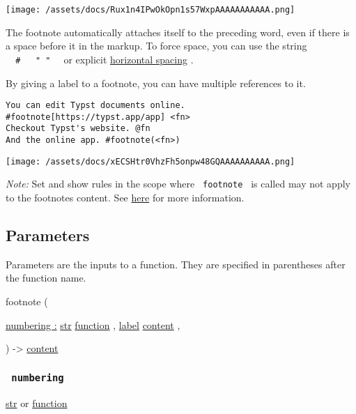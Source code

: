 \texttt{[image: /assets/docs/Rux1n4IPwOkOpn1s57WxpAAAAAAAAAAA.png]}

The footnote automatically attaches itself to the preceding word, even
if there is a space before it in the markup. To force space, you can use
the string
\texttt{\ }{\texttt{\ \#\ }}\texttt{\ }{\texttt{\ "\ "\ }}\texttt{\ } or
explicit \href{/docs/reference/layout/h/}{horizontal spacing} .

By giving a label to a footnote, you can have multiple references to it.

\begin{verbatim}
You can edit Typst documents online.
#footnote[https://typst.app/app] <fn>
Checkout Typst's website. @fn
And the online app. #footnote(<fn>)
\end{verbatim}

\texttt{[image: /assets/docs/xECSHtr0VhzFh5onpw48GQAAAAAAAAAA.png]}

\emph{Note:} Set and show rules in the scope where \texttt{\ footnote\ }
is called may not apply to the footnote\textquotesingle s content. See
\href{https://github.com/typst/typst/issues/1467\#issuecomment-1588799440}{here}
for more information.

\subsection{\texorpdfstring{{ Parameters
}}{ Parameters }}\label{parameters}

\label{parameters-tooltip}
Parameters are the inputs to a function. They are specified in
parentheses after the function name.

{ footnote } (

{ \hyperref[parameters-numbering]{numbering :}
\href{/docs/reference/foundations/str/}{str}
\href{/docs/reference/foundations/function/}{function} , } {
\href{/docs/reference/foundations/label/}{label}
\href{/docs/reference/foundations/content/}{content} , }

) -\textgreater{} \href{/docs/reference/foundations/content/}{content}

\subsubsection{\texorpdfstring{\texttt{\ numbering\ }}{ numbering }}\label{parameters-numbering}

\href{/docs/reference/foundations/str/}{str} {or}
\href{/docs/reference/foundations/function/}{function}

